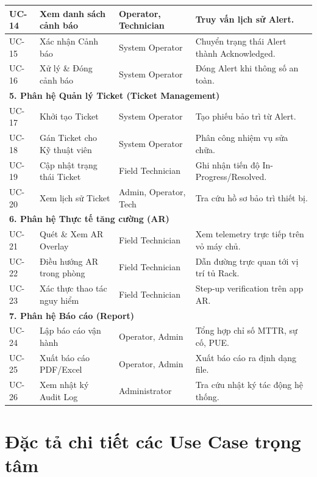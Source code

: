 \begin{longtable}{|p{1.5cm}|p{4.5cm}|p{3.5cm}|p{5cm}|}
UC-14 & Xem danh sách cảnh báo & Operator, Technician & Truy vấn lịch sử Alert. \\ \hline
UC-15 & Xác nhận Cảnh báo & System Operator & Chuyển trạng thái Alert thành Acknowledged. \\ \hline
UC-16 & Xử lý \& Đóng cảnh báo & System Operator & Đóng Alert khi thông số an toàn. \\ \hline
\multicolumn{4}{|l|}{\textbf{5. Phân hệ Quản lý Ticket (Ticket Management)}} \\ \hline
UC-17 & Khởi tạo Ticket & System Operator & Tạo phiếu bảo trì từ Alert. \\ \hline
UC-18 & Gán Ticket cho Kỹ thuật viên & System Operator & Phân công nhiệm vụ sửa chữa. \\ \hline
UC-19 & Cập nhật trạng thái Ticket & Field Technician & Ghi nhận tiến độ In-Progress/Resolved. \\ \hline
UC-20 & Xem lịch sử Ticket & Admin, Operator, Tech & Tra cứu hồ sơ bảo trì thiết bị. \\ \hline
\multicolumn{4}{|l|}{\textbf{6. Phân hệ Thực tế tăng cường (AR)}} \\ \hline
UC-21 & Quét \& Xem AR Overlay & Field Technician & Xem telemetry trực tiếp trên vỏ máy chủ. \\ \hline
UC-22 & Điều hướng AR trong phòng & Field Technician & Dẫn đường trực quan tới vị trí tủ Rack. \\ \hline
UC-23 & Xác thực thao tác nguy hiểm & Field Technician & Step-up verification trên app AR. \\ \hline
\multicolumn{4}{|l|}{\textbf{7. Phân hệ Báo cáo (Report)}} \\ \hline
UC-24 & Lập báo cáo vận hành & Operator, Admin & Tổng hợp chỉ số MTTR, sự cố, PUE. \\ \hline
UC-25 & Xuất báo cáo PDF/Excel & Operator, Admin & Xuất báo cáo ra định dạng file. \\ \hline
UC-26 & Xem nhật ký Audit Log & Administrator & Tra cứu nhật ký tác động hệ thống. \\ \hline
\end{longtable}

\section{Đặc tả chi tiết các Use Case trọng tâm}


